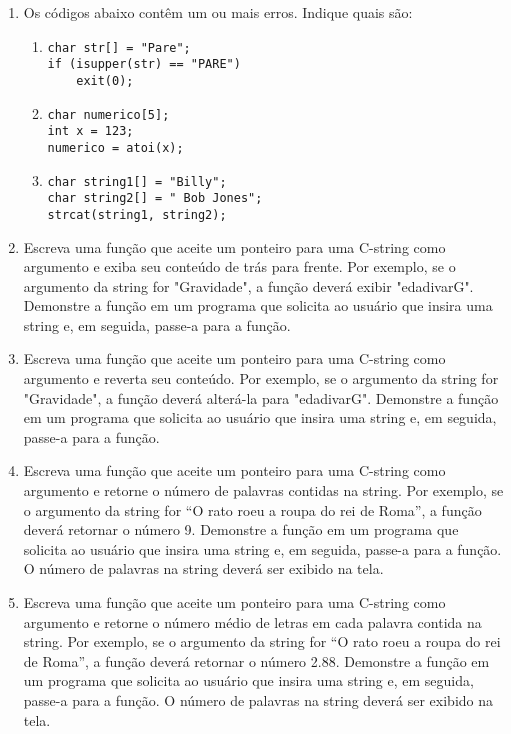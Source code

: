 \documentclass[12pt]{article}
\begin{document}
\begin{enumerate}
\begin{enumerate}
    \end{enumerate}

  \item Os códigos abaixo contêm um ou mais erros. Indique quais são:
    \begin{enumerate}
      \item
        \begin{verbatim}
char str[] = "Pare";
if (isupper(str) == "PARE")
    exit(0);
        \end{verbatim}
      \item
        \begin{verbatim}
char numerico[5];
int x = 123;
numerico = atoi(x);
        \end{verbatim}
      \item
        \begin{verbatim}
char string1[] = "Billy";
char string2[] = " Bob Jones";
strcat(string1, string2);
        \end{verbatim}
    \end{enumerate}

  \item Escreva uma função que aceite um ponteiro para uma C-string como argumento e exiba seu conteúdo de trás para frente. Por exemplo, se o argumento da string for "Gravidade", a função deverá exibir "edadivarG". Demonstre a função em um programa que solicita ao usuário que insira uma string e, em seguida, passe-a para a função.

  \item Escreva uma função que aceite um ponteiro para uma C-string como argumento e reverta seu conteúdo. Por exemplo, se o argumento da string for "Gravidade", a função deverá alterá-la para "edadivarG". Demonstre a função em um programa que solicita ao usuário que insira uma string e, em seguida, passe-a para a função.

  \item Escreva uma função que aceite um ponteiro para uma C-string como argumento e retorne o número de palavras contidas na string. Por exemplo, se o argumento da string for ``O rato roeu a roupa do rei de Roma'', a função deverá retornar o número 9. Demonstre a função em um programa que solicita ao usuário que insira uma string e, em seguida, passe-a para a função. O número de palavras na string deverá ser exibido na tela.

  \item Escreva uma função que aceite um ponteiro para uma C-string como argumento e retorne o número médio de letras em cada palavra contida na string. Por exemplo, se o argumento da string for ``O rato roeu a roupa do rei de Roma'', a função deverá retornar o número 2.88. Demonstre a função em um programa que solicita ao usuário que insira uma string e, em seguida, passe-a para a função. O número de palavras na string deverá ser exibido na tela.


\end{enumerate}
\end{document}

